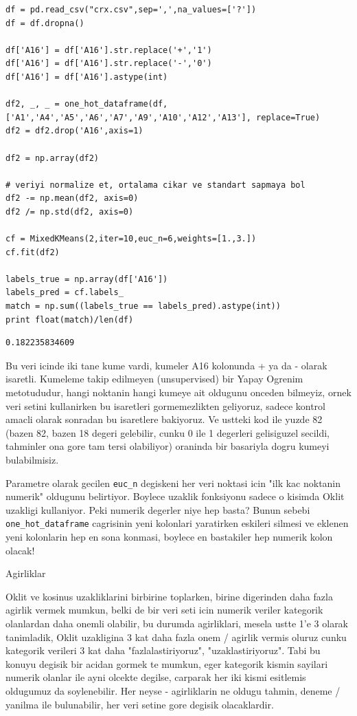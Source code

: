 \documentclass[12pt,fleqn]{article}\usepackage{../common}
\begin{document}
\begin{verbatim}
df = pd.read_csv("crx.csv",sep=',',na_values=['?'])
df = df.dropna()

df['A16'] = df['A16'].str.replace('+','1')
df['A16'] = df['A16'].str.replace('-','0')
df['A16'] = df['A16'].astype(int)

df2, _, _ = one_hot_dataframe(df, ['A1','A4','A5','A6','A7','A9','A10','A12','A13'], replace=True)
df2 = df2.drop('A16',axis=1)

df2 = np.array(df2)

# veriyi normalize et, ortalama cikar ve standart sapmaya bol
df2 -= np.mean(df2, axis=0)
df2 /= np.std(df2, axis=0)

cf = MixedKMeans(2,iter=10,euc_n=6,weights=[1.,3.])
cf.fit(df2)

labels_true = np.array(df['A16'])
labels_pred = cf.labels_
match = np.sum((labels_true == labels_pred).astype(int))
print float(match)/len(df)
\end{verbatim}

\begin{verbatim}
0.182235834609
\end{verbatim}

Bu veri icinde iki tane kume vardi, kumeler A16 kolonunda + ya da - olarak
isaretli. Kumeleme takip edilmeyen (unsupervised) bir Yapay Ogrenim
metotududur, hangi noktanin hangi kumeye ait oldugunu onceden bilmeyiz,
ornek veri setini kullanirken bu isaretleri gormemezlikten geliyoruz,
sadece kontrol amacli olarak sonradan bu isaretlere bakiyoruz. Ve ustteki
kod ile yuzde 82 (bazen 82, bazen 18 degeri gelebilir, cunku 0 ile 1
degerleri gelisiguzel secildi, tahminler ona gore tam tersi olabiliyor)
oraninda bir basariyla dogru kumeyi bulabilmisiz.

Parametre olarak gecilen \verb!euc_n! degiskeni her veri noktasi icin "ilk kac
noktanin numerik" oldugunu belirtiyor. Boylece uzaklik fonksiyonu sadece
o kisimda Oklit uzakligi kullaniyor. Peki numerik degerler niye hep basta?
Bunun sebebi \verb!one_hot_dataframe! cagrisinin yeni kolonlari yaratirken eskileri
silmesi ve eklenen yeni kolonlarin hep en sona konmasi, boylece en bastakiler
hep numerik kolon olacak!

Agirliklar

Oklit ve kosinus uzakliklarini birbirine toplarken, birine digerinden
daha fazla agirlik vermek mumkun, belki de bir veri seti icin numerik
veriler kategorik olanlardan daha onemli olabilir, bu durumda
agirliklari, mesela ustte 1'e 3 olarak tanimladik, Oklit uzakligina 3
kat daha fazla onem / agirlik vermis oluruz cunku kategorik verileri 3
kat daha "fazlalastiriyoruz", "uzaklastiriyoruz". Tabi bu konuyu
degisik bir acidan gormek te mumkun, eger kategorik kismin sayilari
numerik olanlar ile ayni olcekte degilse, carparak her iki kismi
esitlemis oldugumuz da soylenebilir. Her neyse - agirliklarin ne
oldugu tahmin, deneme / yanilma ile bulunabilir, her veri setine gore
degisik olacaklardir.
\end{document}
